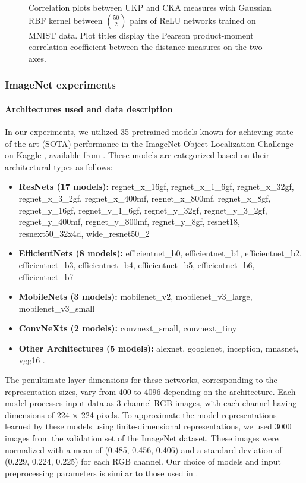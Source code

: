 \documentclass{article}
\theoremstyle{plain}
\begin{document}
\begin{figure}[!h]
    \caption{Correlation plots between UKP and CKA measures with Gaussian RBF kernel between $\binom{50}{2}$ pairs of ReLU networks trained on MNIST data. Plot titles display the Pearson product-moment correlation coefficient between the distance measures on the two axes.}

    \label{MNIST correlation plots bw UKP CKA}
\end{figure}

\FloatBarrier

\subsubsection{ImageNet experiments}
\label{Additional ImageNet experiments}

\paragraph{Architectures used and data description} In our experiments, we utilized 35 pretrained models known for achieving state-of-the-art (SOTA) performance in the ImageNet Object Localization Challenge on Kaggle \cite{imagenet-object-localization-challenge}, available from \citet{pytorch}. These models are categorized based on their architectural types as follows:

\begin{itemize}
    \item \textbf{ResNets (17 models):} regnet\_x\_16gf, regnet\_x\_1\_6gf, regnet\_x\_32gf, regnet\_x\_3\_2gf, regnet\_x\_400mf, regnet\_x\_800mf, regnet\_x\_8gf, regnet\_y\_16gf, regnet\_y\_1\_6gf, regnet\_y\_32gf, regnet\_y\_3\_2gf, regnet\_y\_400mf, regnet\_y\_800mf, regnet\_y\_8gf, resnet18, resnext50\_32x4d, wide\_resnet50\_2
    \item \textbf{EfficientNets (8 models):} efficientnet\_b0, efficientnet\_b1, efficientnet\_b2, efficientnet\_b3, efficientnet\_b4, efficientnet\_b5, efficientnet\_b6, efficientnet\_b7
    \item \textbf{MobileNets (3 models):} mobilenet\_v2, mobilenet\_v3\_large, mobilenet\_v3\_small
    \item \textbf{ConvNeXts (2 models):} convnext\_small, convnext\_tiny
    \item \textbf{Other Architectures (5 models):} alexnet, googlenet, inception, mnasnet, vgg16 .
\end{itemize}

The penultimate layer dimensions for these networks, corresponding to the representation sizes, vary from 400 to 4096 depending on the architecture. Each model processes input data as 3-channel RGB images, with each channel having dimensions of 224 × 224 pixels. To approximate the model representations learned by these models using finite-dimensional representations, we used 3000 images from the validation set of the ImageNet dataset. These images were normalized with a mean of (0.485, 0.456, 0.406) and a standard deviation of (0.229, 0.224, 0.225) for each RGB channel. Our choice of models and input preprocessing parameters is similar to those used in \citet{GULP}.
\end{document}
